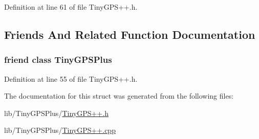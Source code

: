 Definition at line 61 of file Tiny\+G\+P\+S++.\+h.



\subsection{Friends And Related Function Documentation}
\subsubsection[{\texorpdfstring{Tiny\+G\+P\+S\+Plus}{TinyGPSPlus}}]{\setlength{\rightskip}{0pt plus 5cm}friend class {\bf Tiny\+G\+P\+S\+Plus}\hspace{0.3cm}{\ttfamily [friend]}}\hypertarget{struct_tiny_g_p_s_location_a6501fd5ef19ae166d43e0e5781609ee2}{}\label{struct_tiny_g_p_s_location_a6501fd5ef19ae166d43e0e5781609ee2}


Definition at line 55 of file Tiny\+G\+P\+S++.\+h.



The documentation for this struct was generated from the following files\+:\begin{DoxyCompactItemize}
\item 
lib/\+Tiny\+G\+P\+S\+Plus/\hyperlink{_tiny_g_p_s_09_09_8h}{Tiny\+G\+P\+S++.\+h}\item 
lib/\+Tiny\+G\+P\+S\+Plus/\hyperlink{_tiny_g_p_s_09_09_8cpp}{Tiny\+G\+P\+S++.\+cpp}\end{DoxyCompactItemize}
